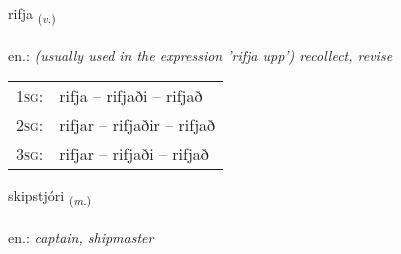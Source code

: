 \documentclass[frontgrid, backgrid]{flacards}\usepackage[]{graphicx}\usepackage[]{xcolor}
\begin{document}
\renewcommand{\blhead}{\vskip5pt {\small\bfseries\footnotesize Sagnorð | Verb }}
\renewcommand{\bcfoot}{\vskip5pt \hspace{2pt}{\small\bfseries\footnotesize 2K}}


{rifja \small{\textsubscript{(\textit{v.})}} \\[1ex] %
\textphonetic{[rɪvja]} \\
en.: \emph{(usually used in the expression 'rifja upp') recollect, revise} \\  [2ex]
\renewcommand*{\arraystretch}{0.8}
\begin{tabular}{p{1cm}l}
\textsc{1sg}: & rifja -- rifjaði -- rifjað \\ 
\textsc{2sg}: & rifjar -- rifjaðir -- rifjað \\ 
\textsc{3sg}: & rifjar -- rifjaði -- rifjað \\ 
\end{tabular}
}

\renewcommand{\flhead}{\vskip5pt \fboxsep=0pt {\small\bfseries\footnotesize Nafnorð | Noun}}
\renewcommand{\fcfoot}{\vskip5pt \fboxsep=0pt \hspace{2pt}{\small\bfseries\footnotesize 2K}}

\renewcommand{\blhead}{\vskip5pt {\small\bfseries\footnotesize Nafnorð | Noun }}
\renewcommand{\bcfoot}{\vskip5pt \hspace{2pt}{\small\bfseries\footnotesize 2K}}


{skipstjóri \small{\textsubscript{(\textit{m.})}} \\[1ex] %
\textphonetic{[scɪpstjourɪ]} \\
en.: \emph{captain, shipmaster} \\  [2ex]
\renewcommand*{\arraystretch}{0.8}
}
\end{document}
